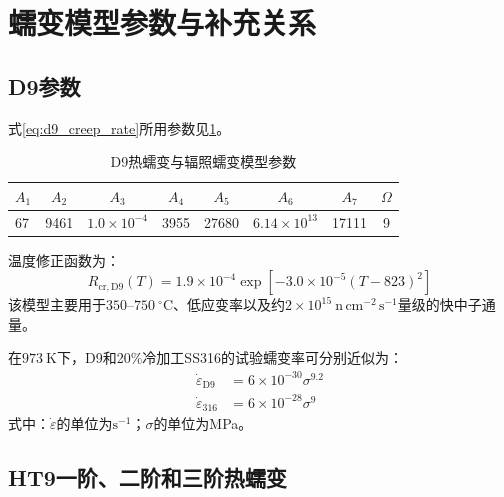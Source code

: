 \section{蠕变模型参数与补充关系}
\label{app:cladding_creep_parameters}

\subsection{D9参数}

式\eqref{eq:d9_creep_rate}所用参数见\tablename\ref{tab:appendix_d9_creep_parameters}\cite{hofmanMetallicFuelsHandbook2019}。
\begin{table}[htbp]
	\centering
	\caption{D9热蠕变与辐照蠕变模型参数}
	\label{tab:appendix_d9_creep_parameters}
	\begin{tabular*}{\textwidth}{
			@{\extracolsep{\fill}}
			lccccccc
			@{}
		}
		\toprule
		$A_1$ & $A_2$ & $A_3$ & $A_4$ & $A_5$ & $A_6$ & $A_7$ & $\Omega$ \\
		\midrule
		67 & 9461 & $1.0\times10^{-4}$ & 3955 & 27680 & $6.14\times10^{13}$ & 17111 & 9 \\
		\bottomrule
	\end{tabular*}
\end{table}
温度修正函数为：
\begin{equation}
	R_{\mathrm{cr,D9}}(T)
	=1.9\times10^{-4}
	\exp[-3.0\times10^{-5}(T-823)^2]
	\label{eq:appendix_d9_creep_temperature_factor}
\end{equation}
该模型主要用于$350$--$750\ ^\circ\mathrm C$、低应变率以及约$2\times10^{15}\ \mathrm{n\,cm^{-2}\,s^{-1}}$量级的快中子通量。

在$973\ \mathrm{K}$下，D9和20\%冷加工SS316的试验蠕变率可分别近似为\cite{lathaThermalCreepProperties2008}：
\begin{equation}
	\label{eq:appendix_d9_ss316_973k_creep}
	\begin{aligned}
		\dot\varepsilon_{\mathrm{D9}}
		&=6\times10^{-30}\sigma^{9.2}\\
		\dot\varepsilon_{316}
		&=6\times10^{-28}\sigma^9
	\end{aligned}
\end{equation}
\noindent 式中：$\dot\varepsilon$的单位为$\mathrm{s^{-1}}$；$\sigma$的单位为MPa。

\subsection{HT9一阶、二阶和三阶热蠕变}

